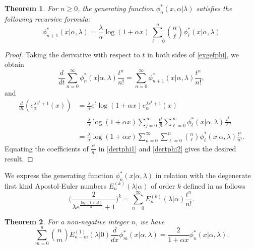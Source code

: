 \documentclass{amsart}
\newtheorem{theorem}{Theorem}[section]
\numberwithin{equation}{section}
\theoremstyle{definition}
\theoremstyle{remark}
\begin{document}
\begin{theorem}
For $n\geq 0$, the generating function $\phi_{n}^*(x,\alpha|\lambda)$ satisfies the following recursive formula:
    \begin{equation}\label{recforphi}
        \phi_{n+1}^*(x|\alpha,\lambda)=\frac{\lambda}{\alpha}\log(1+\alpha x)\sum_{\ell=0}^{n}\binom{n}{\ell}\phi^{*}_\ell(x|\alpha,\lambda)
    \end{equation}
\end{theorem}
\begin{proof}
 Taking the derivative with respect to $t$ in both sides of \eqref{exgefphi}, we obtain 
\begin{equation}\label{dertphi2}
 \frac{d}{dt}\sum_{n=0}^{\infty}\phi^{*}_{n}(x|\alpha,\lambda)\frac{t^n}{n!}=\sum_{n=0}^{\infty}\phi^{*}_{n+1}(x|\alpha,\lambda)\frac{t^n}{n!},   
\end{equation}
and 
\begin{align}
        \frac{d}{dt}\left(e_{\alpha}^{\lambda e^t+1}(x)\right)&=\frac{\lambda}{\alpha}e^t\log(1+\alpha x)e_{\alpha}^{\lambda e^t+1}(x)\\
        &=\frac{\lambda}{\alpha}\log(1+\alpha x)\sum_{j=0}^{\infty}\frac{t^j}{j!}\sum_{\ell=0}^{\infty}\phi_{\ell}^*(x|\alpha,\lambda)\frac{t^\ell}{\ell!}\\
        &=\frac{\lambda}{\alpha}\log(1+\alpha x)\sum_{n=0}^{\infty}\sum_{\ell=0}^{n}\binom{n}{\ell}\phi_{\ell}^*(x|\alpha, \lambda)\frac{t^n}{n!}\label{dertphi1}.
    \end{align}
Equating the coefficients of $\frac{t^n}{n!}$ in \eqref{dertphi1} and \eqref{dertphi2} gives the desired result.
\end{proof}
 We express the generating function $\phi^{*}_{n}(x|\alpha,\lambda)$ in relation with the degenerate first kind Apostol-Euler numbers $E_{n}^{(k)}(\lambda|\alpha)$ of order $k$ defined in \cite{LO2023} as follows 
\begin{equation}\label{dfkAEn}
 \bigg(\frac{2}{\lambda e^{\frac{\log(1+\alpha t)}{\alpha}}+1}\bigg)^k=\sum_{n=0}^{\infty}E_{n}^{(k)}(\lambda|\alpha)\frac{t^n}{n!}.
\end{equation}  
\begin{theorem}
For a non-negative integer $n$, we have 
\begin{equation}
    \sum\limits_{m=0}^{n}\binom{n}{m}E_{n-m}^{(1)}(\lambda|0)\frac{d}{dx}\phi^{*}_{m}(x|\alpha,\lambda)=\frac{2}{1+\alpha x}\phi^{*}_{n}(x|\alpha,\lambda).
  \end{equation}  
\end{theorem}
\end{document}
